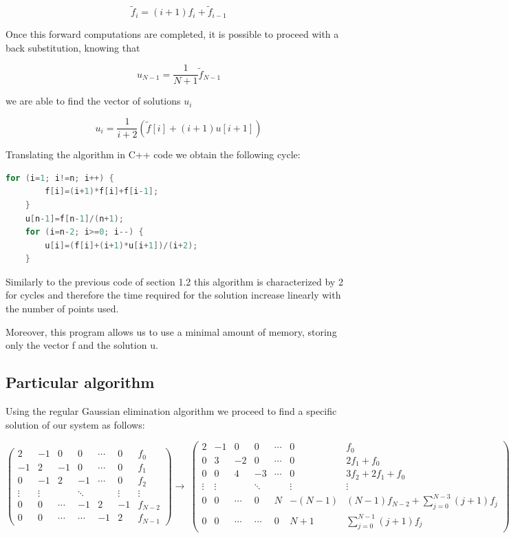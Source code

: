 \documentclass {article}
\begin{document}
$$\tilde{f}_i=(i+1)f_i+\tilde{f}_{i-1}$$

Once this forward computations are completed, it is possible to proceed with a back substitution, knowing that

$$u_{N-1}=\frac{1}{N+1} \tilde{f}_{N-1}$$

we are able to find the vector of solutions $u_i$

$$u_i=\frac{1}{i+2} (\tilde{f}[i]+ (i+1) u[i+1])$$

Translating the algorithm in C++ code we obtain the following cycle:

\begin{lstlisting}[language=cpp]
	for (i=1; i!=n; i++) {
		f[i]=(i+1)*f[i]+f[i-1];
	}
	u[n-1]=f[n-1]/(n+1);
	for (i=n-2; i>=0; i--) {
		u[i]=(f[i]+(i+1)*u[i+1])/(i+2);
	}
\end{lstlisting}

Similarly to the previous code of section 1.2 this algorithm is characterized by 2 for cycles and therefore the time required for the solution increase linearly with the number of points used.

Moreover, this program allows us to use a minimal amount of memory, storing only the vector f and the solution u. 


\subsection{Particular algorithm}

Using the regular Gaussian elimination algorithm we proceed to find a specific solution of our system as follows:

\begin{equation}
\left(
\begin{array}{cccccc|c}
   2 & -1 &  0 & 0 & \cdots & 0 & f_0 \\
  -1 &  2 & -1 & 0 & \cdots & 0 & f_1 \\
   0 &-1 &  2 & -1 & \cdots & 0 & f_2\\
  \vdots  & \vdots  & & \ddots & & \vdots & \vdots  \\
   0 &  0 & \cdots  & -1 & 2 & -1 & f_{N-2} \\
   0 &  0 & \cdots & \cdots  & -1 & 2 & f_{N-1} 
\end{array}	
\right)
\longrightarrow\
\left(
\begin{array}{cccccc|c}
   2 & -1 &  0 & 0 & \cdots & 0 & f_0 \\
   0 &  3 & -2 & 0 & \cdots & 0 & 2 f_1+f_0 \\
   0 & 0 &  4 & -3 & \cdots & 0 & 3 f_2+2 f_1+f_0\\
  \vdots  & \vdots  & & \ddots & & \vdots & \vdots  \\
   0 &  0 & \cdots  & 0 & N & -(N-1) &  (N-1) f_{N-2} + \sum_{j=0}^{N-3} (j+1)f_{j}  \\
   0 &  0 & \cdots & \cdots  & 0 & N+1 &  \sum_{j=0}^{N-1} (j+1)f_{j} 
\end{array}	
\right)
\end{equation}
\end{document}
